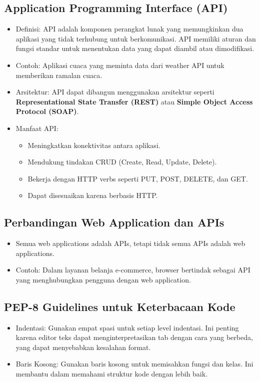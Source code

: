 \documentclass{article}
\begin{document}
\subsection{Application Programming Interface (API)}
\begin{itemize}
    \item Definisi: API adalah komponen perangkat lunak yang memungkinkan dua aplikasi yang tidak terhubung untuk berkomunikasi. API memiliki aturan dan fungsi standar untuk menentukan data yang dapat diambil atau dimodifikasi.
    \item Contoh: Aplikasi cuaca yang meminta data dari weather API untuk memberikan ramalan cuaca.
    \item Arsitektur: API dapat dibangun menggunakan arsitektur seperti \textbf{Representational State Transfer (REST)} atau \textbf{Simple Object Access Protocol (SOAP)}.
    \item Manfaat API\@:
          \begin{itemize}
              \item Meningkatkan konektivitas antara aplikasi.
              \item Mendukung tindakan CRUD (Create, Read, Update, Delete).
              \item Bekerja dengan HTTP verbs seperti PUT, POST, DELETE, dan GET\@.
              \item Dapat disesuaikan karena berbasis HTTP\@.
          \end{itemize}
\end{itemize}

\subsection{Perbandingan Web Application dan APIs}
\begin{itemize}
    \item Semua web applications adalah APIs, tetapi tidak semua APIs adalah web applications.
    \item Contoh: Dalam layanan belanja e-commerce, browser bertindak sebagai API yang menghubungkan pengguna dengan web application.
\end{itemize}

\subsection{PEP-8 Guidelines untuk Keterbacaan Kode}
\begin{itemize}
    \item Indentasi: Gunakan empat spasi untuk setiap level indentasi. Ini penting karena editor teks dapat menginterpretasikan tab dengan cara yang berbeda, yang dapat menyebabkan kesalahan format.
    \item Baris Kosong: Gunakan baris kosong untuk memisahkan fungsi dan kelas. Ini membantu dalam memahami struktur kode dengan lebih baik.
\end{itemize}
\end{document}
